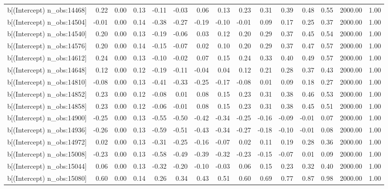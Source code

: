 \begin{table}[ht]
\begin{tabular}{rrrrrrrrrrrrrrr}
  b[(Intercept) n\_obs:14468] & 0.22 & 0.00 & 0.13 & -0.11 & -0.03 & 0.06 & 0.13 & 0.23 & 0.31 & 0.39 & 0.48 & 0.55 & 2000.00 & 1.00 \\ 
  b[(Intercept) n\_obs:14504] & -0.01 & 0.00 & 0.14 & -0.38 & -0.27 & -0.19 & -0.10 & -0.01 & 0.09 & 0.17 & 0.25 & 0.37 & 2000.00 & 1.00 \\ 
  b[(Intercept) n\_obs:14540] & 0.20 & 0.00 & 0.13 & -0.19 & -0.06 & 0.03 & 0.12 & 0.20 & 0.29 & 0.37 & 0.45 & 0.54 & 2000.00 & 1.00 \\ 
  b[(Intercept) n\_obs:14576] & 0.20 & 0.00 & 0.14 & -0.15 & -0.07 & 0.02 & 0.10 & 0.20 & 0.29 & 0.37 & 0.47 & 0.57 & 2000.00 & 1.00 \\ 
  b[(Intercept) n\_obs:14612] & 0.24 & 0.00 & 0.13 & -0.10 & -0.02 & 0.07 & 0.15 & 0.24 & 0.33 & 0.40 & 0.49 & 0.57 & 2000.00 & 1.00 \\ 
  b[(Intercept) n\_obs:14648] & 0.12 & 0.00 & 0.12 & -0.19 & -0.11 & -0.04 & 0.04 & 0.12 & 0.21 & 0.28 & 0.37 & 0.43 & 2000.00 & 1.00 \\ 
  b[(Intercept) n\_obs:14810] & -0.08 & 0.00 & 0.13 & -0.41 & -0.33 & -0.25 & -0.17 & -0.08 & 0.01 & 0.09 & 0.18 & 0.27 & 2000.00 & 1.00 \\ 
  b[(Intercept) n\_obs:14852] & 0.23 & 0.00 & 0.12 & -0.08 & 0.01 & 0.08 & 0.15 & 0.23 & 0.31 & 0.38 & 0.46 & 0.53 & 2000.00 & 1.00 \\ 
  b[(Intercept) n\_obs:14858] & 0.23 & 0.00 & 0.12 & -0.06 & -0.01 & 0.08 & 0.15 & 0.23 & 0.31 & 0.38 & 0.45 & 0.51 & 2000.00 & 1.00 \\ 
  b[(Intercept) n\_obs:14900] & -0.25 & 0.00 & 0.13 & -0.55 & -0.50 & -0.42 & -0.34 & -0.25 & -0.16 & -0.09 & -0.01 & 0.07 & 2000.00 & 1.00 \\ 
  b[(Intercept) n\_obs:14936] & -0.26 & 0.00 & 0.13 & -0.59 & -0.51 & -0.43 & -0.34 & -0.27 & -0.18 & -0.10 & -0.01 & 0.08 & 2000.00 & 1.00 \\ 
  b[(Intercept) n\_obs:14972] & 0.02 & 0.00 & 0.13 & -0.31 & -0.25 & -0.16 & -0.07 & 0.02 & 0.11 & 0.19 & 0.28 & 0.36 & 2000.00 & 1.00 \\ 
  b[(Intercept) n\_obs:15008] & -0.23 & 0.00 & 0.13 & -0.58 & -0.49 & -0.39 & -0.32 & -0.23 & -0.15 & -0.07 & 0.01 & 0.09 & 2000.00 & 1.00 \\ 
  b[(Intercept) n\_obs:15044] & 0.06 & 0.00 & 0.13 & -0.32 & -0.20 & -0.10 & -0.03 & 0.06 & 0.15 & 0.23 & 0.32 & 0.40 & 2000.00 & 1.00 \\ 
  b[(Intercept) n\_obs:15080] & 0.60 & 0.00 & 0.14 & 0.26 & 0.34 & 0.43 & 0.51 & 0.60 & 0.69 & 0.77 & 0.87 & 0.98 & 2000.00 & 1.00 \\ 

\end{tabular}
\end{table}
